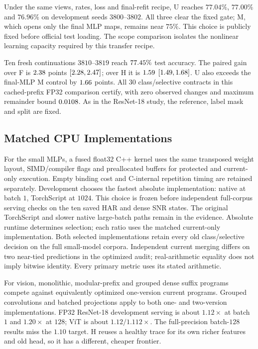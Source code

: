 Under the same views, rates, loss and final-refit recipe, U reaches
$77.04\%$, $77.00\%$ and $76.96\%$ on development seeds $3800$--$3802$.
All three clear the fixed gate; M, which opens only the final MLP maps,
remains near $75\%$. This choice is publicly fixed before official test
loading. The scope comparison isolates the nonlinear learning capacity required
by this transfer recipe.

Ten fresh continuations $3810$--$3819$ reach $77.45\%$ test accuracy.
The paired gain over F is $2.38$ points
$[2.28,2.47]$; over H it is
$1.59$ $[1.49,1.68]$.
U also exceeds the final-MLP M control by $1.66$ points.
All $30$ class/selective contracts in this cached-prefix FP32 comparison
certify, with zero observed changes and maximum remainder bound
$0.0108$. As in the ResNet-18 study, the reference, label mask and split are fixed.



\subsection{Matched CPU Implementations}\label{app:frontier_native}

For the small MLPs, a fused float32 C++ kernel uses the same transposed
weight layout, SIMD/compiler flags and preallocated buffers for protected
and current-only execution. Empty binding cost and C-internal repetition
timing are retained separately. Development chooses the fastest absolute
implementation: native at batch $1$, TorchScript at $1024$. This choice is
frozen before independent full-corpus serving checks on the ten saved HAR
and dense SNR states. The original TorchScript and slower native large-batch
paths remain in the evidence. Absolute runtime determines selection; each ratio uses the matched current-only implementation.
Both selected implementations retain every old class/selective decision on
the full small-model corpora. Independent current merging differs on two
near-tied predictions in the optimized audit; real-arithmetic equality does
not imply bitwise identity. Every primary metric uses its stated arithmetic.

For vision, monolithic, modular-prefix and grouped dense suffix programs
compete against equivalently optimized one-version current programs.
Grouped convolutions and batched projections apply to both one- and
two-version implementations. FP32 ResNet-18 development serving is about $1.12\times$ at batch $1$ and
$1.20\times$ at $128$; ViT is about $1.12/1.112\times$. The full-precision
batch-$128$ results miss the $1.10$ target. H reuses a healthy trace for its
own richer features and old head, so it has a different, cheaper frontier.

